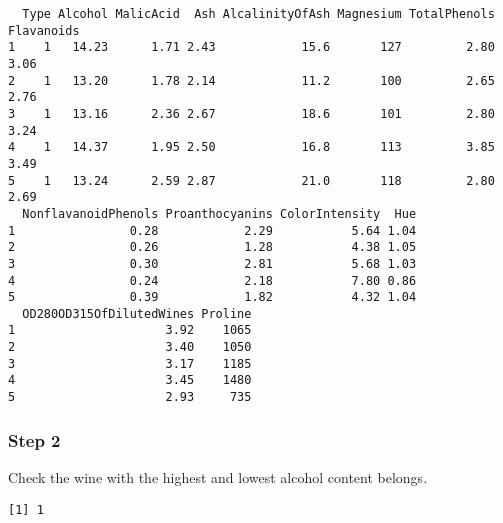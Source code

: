\documentclass[
  letterpaper,
  DIV=11,
  numbers=noendperiod]{scrartcl}
\newenvironment{Shaded}{\begin{snugshade}}{\end{snugshade}}
\newcommand{\CommentTok}[1]{\textcolor[rgb]{0.37,0.37,0.37}{#1}}
\newcommand{\FunctionTok}[1]{\textcolor[rgb]{0.28,0.35,0.67}{#1}}
\newcommand{\NormalTok}[1]{\textcolor[rgb]{0.00,0.23,0.31}{#1}}
\newcommand{\OtherTok}[1]{\textcolor[rgb]{0.00,0.23,0.31}{#1}}
\newcommand{\SpecialCharTok}[1]{\textcolor[rgb]{0.37,0.37,0.37}{#1}}
\begin{document}
\begin{verbatim}
  Type Alcohol MalicAcid  Ash AlcalinityOfAsh Magnesium TotalPhenols Flavanoids
1    1   14.23      1.71 2.43            15.6       127         2.80       3.06
2    1   13.20      1.78 2.14            11.2       100         2.65       2.76
3    1   13.16      2.36 2.67            18.6       101         2.80       3.24
4    1   14.37      1.95 2.50            16.8       113         3.85       3.49
5    1   13.24      2.59 2.87            21.0       118         2.80       2.69
  NonflavanoidPhenols Proanthocyanins ColorIntensity  Hue
1                0.28            2.29           5.64 1.04
2                0.26            1.28           4.38 1.05
3                0.30            2.81           5.68 1.03
4                0.24            2.18           7.80 0.86
5                0.39            1.82           4.32 1.04
  OD280OD315OfDilutedWines Proline
1                     3.92    1065
2                     3.40    1050
3                     3.17    1185
4                     3.45    1480
5                     2.93     735
\end{verbatim}

\hypertarget{step-2}{%
\subsubsection{Step 2}\label{step-2}}

Check the wine with the highest and lowest alcohol content belongs.

\begin{Shaded}
\end{Shaded}

\begin{verbatim}
[1] 1
\end{verbatim}

\begin{Shaded}
\end{Shaded}
\end{document}
